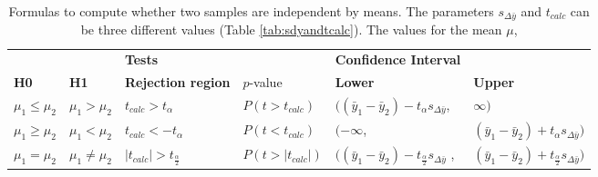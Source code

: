 \documentclass[10pt,a4paper]{article}
\begin{document}
	\begin{table}[h!]
	\centering
	\caption{Formulas to compute whether two samples are independent by means. 
	The parameters $s_{\Delta\bar{y}}$ and $t_{calc}$ can be three different 
	values (Table \ref{tab:sdyandtcalc})\cite{heiberger2004statistical}. The values for the mean $\mu$, }
	\label{tab:IndepTest}
	\begin{tabular}{llllll}
		\hline
		 &  & 
		\multicolumn{2}{l}{\textbf{Tests}} & 
		\textbf{Confidence Interval} & \textbf{}               \\ \cline{3-6} 
		\textbf{H0}              & \textbf{H1}              & \textbf{Rejection 
		region}   & $p$-value                      & 
		\textbf{Lower}               & \textbf{Upper}          \\ \hline
		$\mu_1 \leq \mu_2$                  & $\mu_1 > \mu_2$       & 
		$t_{calc} 
		> t_\alpha$       & $P(t > t_{calc})$      & 
		$((\bar{y}_1 
		- \bar{y}_2) - t_\alpha s_{\Delta \bar{y}}$,       & 
		$\infty)$                     \\
		$\mu_1 \geq \mu_2$                  & $\mu_1 < \mu_2$          & 
		$t_{calc} 
		< -t_\alpha$          & $P(t < t_{calc})$         & 
		$(-\infty$,                        & $(\bar{y}_1 - \bar{y}_2) + 
		t_\alpha 
		s_{\Delta \bar{y}})$ \\
		$\mu_1 = \mu_2$                  & $\mu_1 \neq \mu_2$                  
		& 
		$|t_{calc}| > t_{\frac{\alpha}{2}}$     & $P(t >
		|t_{calc}|)$  & $((\bar{y}_1 - \bar{y}_2) - 
		t_{\frac{\alpha}{2}} 
		s_{\Delta\bar{y}}$ 
		,     & $(\bar{y}_1 - \bar{y}_2) + t_{\frac{\alpha}{2}} 
		s_{\Delta 
		\bar{y}})$  
		\\ 
		\hline
	\end{tabular}
	\end{table}
	
\end{document}
